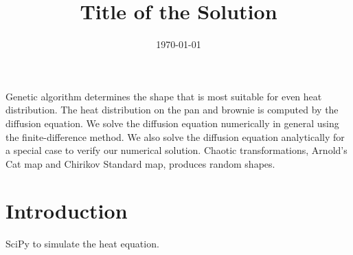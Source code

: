 \documentclass[12pt]{reedmcm}
\title{\textbf{Title of the Solution}}
\date{\today}
\begin{document}

\begin{summary}
  Genetic algorithm determines the shape that is most suitable for even heat distribution.
  The heat distribution on the pan and brownie is computed by the diffusion equation.
  We solve the diffusion equation numerically in general using the finite-difference method.
  We also solve the diffusion equation analytically for a special case to verify our numerical solution.
  Chaotic transformations, Arnold's Cat map and Chirikov Standard map, produces random shapes.


  \end{summary}

\maketitle
\tableofcontents

\section{Introduction}
SciPy to simulate the heat equation.
\end{document}
